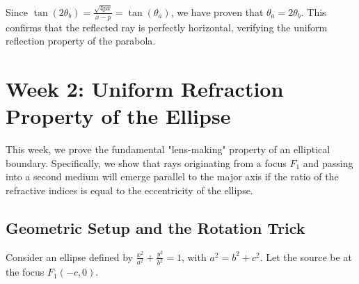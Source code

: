 \documentclass{article}
\begin{document}
Since $\tan(2\theta_b) = \frac{\sqrt{4px}}{x - p} = \tan(\theta_a)$, we have proven that $\theta_a = 2\theta_b$. This confirms that the reflected ray is perfectly horizontal, verifying the uniform reflection property of the parabola.

\section{Week 2: Uniform Refraction Property of the Ellipse}

This week, we prove the fundamental "lens-making" property of an elliptical boundary. Specifically, we show that rays originating from a focus $F_1$ and passing into a second medium will emerge parallel to the major axis if the ratio of the refractive indices is equal to the eccentricity of the ellipse.

\subsection{Geometric Setup and the Rotation Trick}
Consider an ellipse defined by $\frac{x^2}{a^2} + \frac{y^2}{b^2} = 1$, with $a^2 = b^2 + c^2$. Let the source be at the focus $F_1(-c, 0)$. 
\end{document}
